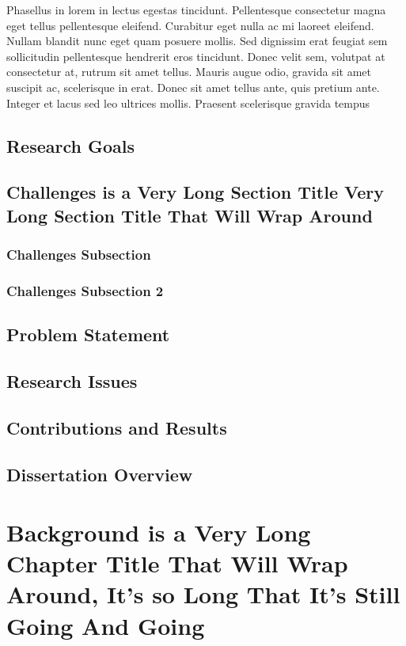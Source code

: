 \documentclass[12pt]{report}	%
\begin{document}
Phasellus in lorem in lectus egestas tincidunt. Pellentesque consectetur
magna eget tellus pellentesque eleifend. Curabitur eget nulla ac mi
laoreet eleifend. Nullam blandit nunc eget quam posuere mollis. Sed
dignissim erat feugiat sem sollicitudin pellentesque hendrerit eros
tincidunt. Donec velit sem, volutpat at consectetur at, rutrum sit amet
tellus. Mauris augue odio, gravida sit amet suscipit ac, scelerisque in
erat. Donec sit amet tellus ante, quis pretium ante. Integer et lacus
sed leo ultrices mollis. Praesent scelerisque gravida tempus
\section{Research Goals}
\section{Challenges is a Very Long Section Title Very Long Section Title That Will Wrap Around}
\subsection{Challenges Subsection}
\subsection{Challenges Subsection 2}
\section{Problem Statement}
\section{Research Issues}
\section{Contributions and Results}
\section{Dissertation Overview}

\chapter{Background is a Very Long Chapter Title That Will Wrap Around, It's so Long That It's Still Going And Going}
\end{document}
